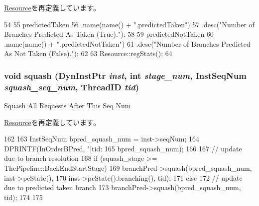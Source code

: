 \hyperlink{classResource_ac1739a9be0fbd5d96cf441cd3b2c1c78}{Resource}を再定義しています。


\begin{DoxyCode}
54 {
55     predictedTaken
56         .name(name() + ".predictedTaken")
57         .desc("Number of Branches Predicted As Taken (True).");
58 
59     predictedNotTaken
60         .name(name() + ".predictedNotTaken")
61         .desc("Number of Branches Predicted As Not Taken (False).");
62 
63     Resource::regStats();
64 }
\end{DoxyCode}
\hypertarget{classBranchPredictor_a52235c5e3d912452f254dc45f1496fd2}{
\subsubsection[{squash}]{\setlength{\rightskip}{0pt plus 5cm}void squash ({\bf DynInstPtr} {\em inst}, \/  int {\em stage\_\-num}, \/  {\bf InstSeqNum} {\em squash\_\-seq\_\-num}, \/  {\bf ThreadID} {\em tid})}}
\label{classBranchPredictor_a52235c5e3d912452f254dc45f1496fd2}
Squash All Requests After This Seq Num 

\hyperlink{classResource_a52235c5e3d912452f254dc45f1496fd2}{Resource}を再定義しています。


\begin{DoxyCode}
162 {
163     InstSeqNum bpred_squash_num = inst->seqNum;
164     DPRINTF(InOrderBPred, "[tid:%
165             bpred_squash_num);
166 
167     // update due to branch resolution
168     if (squash_stage >= ThePipeline::BackEndStartStage) {
169         branchPred->squash(bpred_squash_num, inst->pcState(),
170                            inst->pcState().branching(), tid);
171     } else {
172     // update due to predicted taken branch
173         branchPred->squash(bpred_squash_num, tid);
174     }
175 }
\end{DoxyCode}


